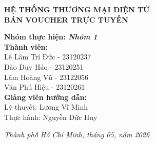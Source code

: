 \begin{titlepage}
\begin{center}
{\fontsize{18}{22}\selectfont\bfseries\color{navyblue}
HỆ THỐNG THƯƠNG MẠI ĐIỆN TỬ\\[0.25cm]
BÁN VOUCHER TRỰC TUYẾN}

\end{center}

\vspace*{\fill}

\begin{flushleft}
\hspace{2.5cm}
{\fontsize{12}{16}\selectfont\bfseries\color{navyblue}
Nhóm thực hiện: \textit{Nhóm 1}}\\[0.2cm]
\hspace{2.5cm}
{\fontsize{12}{16}\selectfont\bfseries\color{navyblue}
Thành viên:}\\[0.1cm]
\hspace{3.0cm}
{\fontsize{12}{14}\selectfont\color{navyblue}
Lê Lâm Trí Đức - 23120237}\\[0.1cm]
\hspace{3.0cm}
{\fontsize{12}{14}\selectfont\color{navyblue}
Đào Duy Hảo - 23120251}\\[0.1cm]
\hspace{3.0cm}
{\fontsize{12}{14}\selectfont\color{navyblue}
Lâm Hoàng Vũ - 23122056}\\[0.1cm]
\hspace{3.0cm}
{\fontsize{12}{14}\selectfont\color{navyblue}
Văn Phú Hiệu - 23120261}\\[0.3cm]
\hspace{2.5cm}
{\fontsize{12}{16}\selectfont\bfseries\color{navyblue}
Giảng viên hướng dẫn:}\\[0.1cm]
\hspace{3.0cm}
{\fontsize{12}{14}\selectfont\color{navyblue}
Lý thuyết: Lương Vĩ Minh}\\[0.1cm]
\hspace{3.0cm}
{\fontsize{12}{14}\selectfont\color{navyblue}
Thực hành: Nguyễn Đức Huy}
\end{flushleft}

\vspace{0.8cm}

\begin{center}
{\fontsize{11}{13}\selectfont\itshape\color{navyblue}
Thành phố Hồ Chí Minh, tháng 05, năm 2026}
\end{center}

\vspace{0.4cm}

\end{titlepage}
